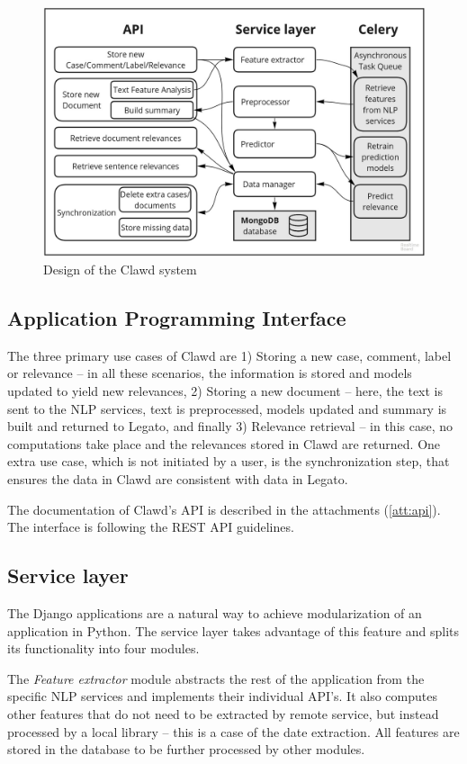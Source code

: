 \documentclass[
  digital, %
  notable,   %
  nolof,     %
  nolot,     %
]{fithesis3}
\begin{document}
\begin{figure}[h]
\caption{Design of the Clawd system}
\label{fig:Design}
\includegraphics[width=\textwidth]{img/Design}
\end{figure}

\subsection{Application Programming Interface}
\label{sec:api}
The three primary use cases of Clawd are 1) Storing a new case, comment, label or relevance -- in all these scenarios, the information is stored and models updated to yield new relevances, 2) Storing a new document -- here, the text is sent to the NLP services, text is preprocessed, models updated and summary is built and returned to Legato, and finally 3) Relevance retrieval -- in this case, no computations take place and the relevances stored in Clawd are returned.
One extra use case, which is not initiated by a user, is the synchronization step, that ensures the data in Clawd are consistent with data in Legato.

The documentation of Clawd's API is described in the attachments (\ref{att:api}).
The interface is following the REST API guidelines.

\subsection{Service layer}
The Django applications are a natural way to achieve modularization of an application in Python.
The service layer takes advantage of this feature and splits its functionality into four modules.

The \textit{Feature extractor} module abstracts the rest of the application from the specific NLP services and implements their individual API's.
It also computes other features that do not need to be extracted by remote service, but instead processed by a local library -- this is a case of the date extraction.
All features are stored in the database to be further processed by other modules.
\end{document}
